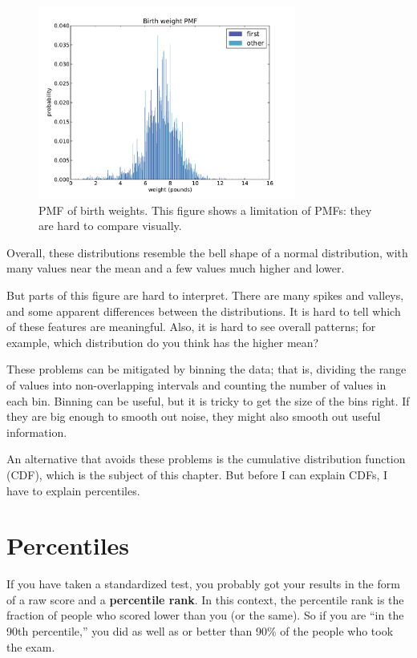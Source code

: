 \documentclass[12pt]{book}
\begin{document}
\begin{figure}
\centerline{\includegraphics[height=2.5in]{figs/nsfg_birthwgt_pmf.pdf}}
\caption{PMF of birth weights.  This figure shows a limitation
of PMFs: they are hard to compare visually.}
\label{nsfg_birthwgt_pmf}
\end{figure}

Overall, these distributions resemble the bell shape of a normal
distribution, with many values near the mean and a few values much
higher and lower.

But parts of this figure are hard to interpret.  There are many spikes
and valleys, and some apparent differences between the distributions.
It is hard to tell which of these features are meaningful.  Also, it
is hard to see overall patterns; for example, which distribution do
you think has the higher mean?

These problems can be mitigated by binning the data; that is, dividing
the range of values into non-overlapping intervals and counting the
number of values in each bin.  Binning can be useful, but it is tricky
to get the size of the bins right.  If they are big enough to smooth
out noise, they might also smooth out useful information.

An alternative that avoids these problems is the cumulative
distribution function (CDF), which is the subject of this chapter.
But before I can explain CDFs, I have to explain percentiles.


\section{Percentiles}

If you have taken a standardized test, you probably got your
results in the form of a raw score and a {\bf percentile rank}.
In this context, the percentile rank is the fraction of people who
scored lower than you (or the same).  So if you are ``in the 90th
percentile,'' you did as well as or better than 90\% of the people who
took the exam.
\end{document}
